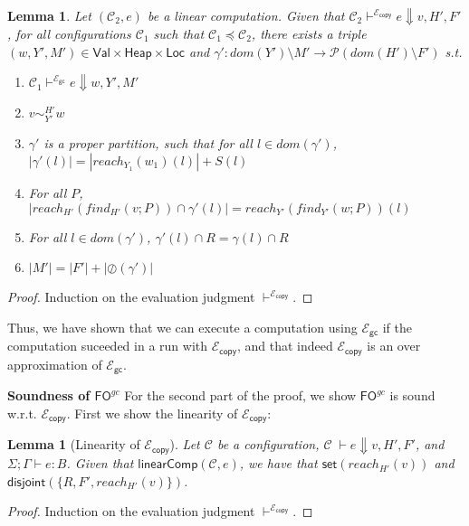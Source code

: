 \documentclass{easychair}
\newcommand{\ms}[1]{\ensuremath{\mathsf{#1}}}
\newcommand{\dist}[1]{\mathsf{disjoint}(#1)}
\newcommand{\linearComp}[2]{\mathsf{linearComp}(#1,#2)}
\newcommand{\veq}[4]{#3 \sim^{#1}_{#2} #4}
\newcommand{\oh}[1]{\oslash(#1)}
\newcommand{\fogc}{\ms{FO}^{gc}}
\newcommand{\gcSem}{\ensuremath{\mathcal{E}_{\ms{gc}}}}
\newcommand{\copySem}{\ensuremath{\mathcal{E}_{\ms{copy}}}}
\newtheorem{lemma}[theorem]{Lemma}
\theoremstyle{definition}
\begin{document}
\begin{lemma}
	Let $(\mathcal{C}_2,e)$ be a linear computation. Given that 
	$\mathcal{C}_2 \vdash^{\copySem{}} e \Downarrow v,H',F'$,
	for all configurations $\mathcal{C}_1$ such that $\mathcal{C}_1 \preceq \mathcal{C}_2$,
there exists a triple
$(w,Y',M') \in \ms{Val} \times \ms{Heap} \times \ms{Loc}$ and 
	$\gamma' : dom(Y') \setminus M' \to \mathcal{P}(dom(H') \setminus F')$ s.t.
	\begin{enumerate}
			\item $\mathcal{C}_1 \vdash^{\gcSem{}} e \Downarrow w,Y',M'$
			\item $\veq{H'}{Y'}{v}{w}$
			\item $\gamma'$ is a proper partition, such that for all $l \in dom(\gamma')$, 
				$|\gamma'(l)| = |reach_{Y_1}(w_1)(l)| + S(l)$
			\item For all $P$, $|reach_{H'}(find_{H'}(v;P)) \cap \gamma'(l)| = 
				reach_{Y'}(find_{Y'}(w;P))(l)$
			\item For all $l \in dom(\gamma')$, $\gamma'(l) \cap R = \gamma(l) \cap R$
			\item $|M'| = |F'| + |\oh{\gamma'}|$
	\end{enumerate}
\end{lemma}

\begin{proof}
	Induction on the evaluation judgment $\vdash^{\copySem{}}$.
\end{proof}

Thus, we have shown that we can execute a computation using 
\gcSem{} if the computation suceeded in a run with \copySem{}, and that indeed 
\copySem{} is an over approximation of \gcSem{}.

\textbf{Soundness of $\fogc$}
\label{sect:soundcopy}
For the second part of the proof, we show $\fogc$ is sound w.r.t. \copySem{}. First we
show the linearity of \copySem{}: 
 
\begin{lemma}[Linearity of \copySem{}]\label{itm:na}
  Let $\mathcal{C}$ be a configuration, $\mathcal{C} \; \vdash e \Downarrow v, H', F'$, and
  $\Sigma; \Gamma \vdash e : B$. Given that $\linearComp{\mathcal{C}}{e}$,
  we have that $\ms{set}(reach_{H'}(v))$ and $\dist{\{R,F',reach_{H'}(v)\}}$.
\end{lemma}

\begin{proof}
Induction on the evaluation judgment $\vdash^{\copySem{}}$.
\end{proof}
\end{document}
